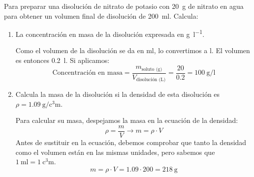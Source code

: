 \begin{example}
    Para preparar una disolución de nitrato de potasio con \qty{20}{\g} de nitrato en agua para obtener un volumen final de disolución de \qty{200}{\ml}. Calcula:
    \begin{enumerate}[label=\letraminuscula]
\item La concentración en masa de la disolución expresada en \unit{\g\per\litre}.

Como el volumen de la disolución se da en \unit{\ml}, lo convertimos a \unit{\litre}. El volumen es entonces \qty{0.2}{\litre}. Si aplicamos:
\begin{equation*}
    \text{Concentración en masa} = \dfrac{m_{\text{soluto (g)}}}{V_{\text{disolución (L)}}} = \dfrac{20}{0.2} = \qty{100}{\g\per\litre}
\end{equation*}

\item Calcula la masa de la disolución si la densidad de esta disolución es \( \rho = \qty{1.09}{\g\per\cubic\centi\metre} \).

Para calcular su masa, despejamos la masa en la ecuación de la densidad:
\begin{equation*}
    \rho = \dfrac{m}{V} \rightarrow m = \rho \cdot V
\end{equation*}
Antes de sustituir en la ecuación, debemos comprobar que tanto la densidad como el volumen están en las mismas unidades, pero sabemos que \( \qty{1}{\ml} = \qty{1}{\cubic\centi\metre} \).
\begin{equation*}
    m = \rho \cdot V = 1.09 \cdot 200 = \qty{218}{\g}
\end{equation*}
    \end{enumerate}
\end{example}

